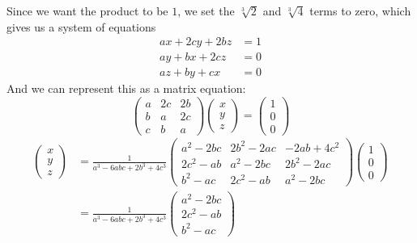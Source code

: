 \documentclass[12pt]{article}
\begin{document}
\begin{enumerate}
                    Since we want the product to be $1$, we set the $\sqrt[3]{2}$ and $\sqrt[3]{4}$ terms to zero, which gives us a system of equations 
                    \begin{align*}
                        ax + 2cy + 2bz &= 1\\
                        ay + bx + 2cz &= 0\\
                        az + by + cx &= 0
                    \end{align*}
                    And we can represent this as a matrix equation:
                    \[\begin{pmatrix}
                        a & 2c & 2b\\
                        b & a & 2c\\
                        c & b & a
                    \end{pmatrix} \begin{pmatrix}
                        x\\y\\z
                    \end{pmatrix} = \begin{pmatrix}
                        1\\0\\0
                    \end{pmatrix}\]
                    \begin{align*}
                        \begin{pmatrix}
                            x\\y\\z 
                        \end{pmatrix} &= \frac{1}{a^3 - 6abc + 2b^3 + 4c^3} \begin{pmatrix}
                            a^2 - 2bc & 2b^2 - 2ac & -2ab + 4c^2\\
                            2c^2 - ab & a^2 - 2bc & 2b^2 - 2ac\\
                            b^2 - ac & 2c^2 - ab & a^2 - 2bc
                        \end{pmatrix} \begin{pmatrix}
                            1\\0\\0
                        \end{pmatrix}\\
                        &= \frac{1}{a^3 - 6abc + 2b^3 + 4c^3} \begin{pmatrix}
                            a^2 - 2bc\\
                            2c^2 - ab\\
                            b^2 - ac
                        \end{pmatrix}
                    \end{align*}
                    

\end{enumerate}
\end{document}
